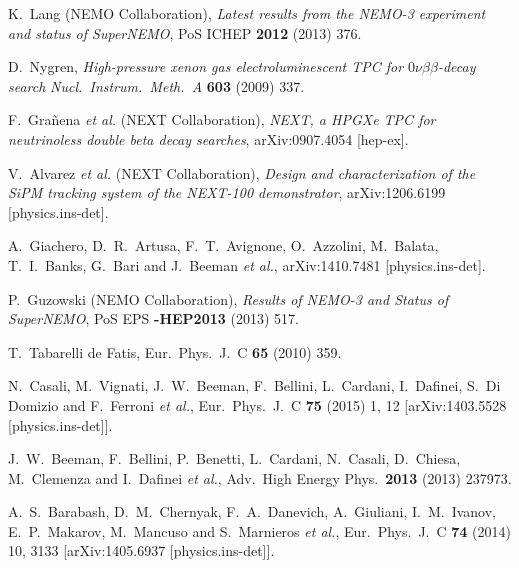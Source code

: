 \documentclass{PoS}
\begin{document}
\begin{thebibliography}{99}
   K.~Lang (NEMO Collaboration),
   \emph{Latest results from the NEMO-3 experiment and status of SuperNEMO},
   PoS ICHEP {\bf 2012} (2013) 376.

   D.~Nygren,
   \emph{High-pressure xenon gas electroluminescent TPC for $0\nu\beta\beta$-decay search}
   \emph{Nucl.\ Instrum.\ Meth.\ A} {\bf 603} (2009) 337.

   F.~Gra\~nena {\it et al.} (NEXT Collaboration),
   \emph{NEXT, a HPGXe TPC for neutrinoless double beta decay searches},
   arXiv:0907.4054 [hep-ex].

  V.~Alvarez {\it et al.} (NEXT Collaboration),
   \emph{Design and characterization of the SiPM tracking system of the NEXT-100 demonstrator},
   arXiv:1206.6199 [physics.ins-det].

  A.~Giachero, D.~R.~Artusa, F.~T.~Avignone, O.~Azzolini, M.~Balata, T.~I.~Banks, G.~Bari and J.~Beeman {\it et al.},
  arXiv:1410.7481 [physics.ins-det].

   P.~Guzowski (NEMO Collaboration),
   \emph{Results of NEMO-3 and Status of SuperNEMO},
   PoS EPS {\bf -HEP2013} (2013) 517.

  T.~Tabarelli de Fatis,
  Eur.\ Phys.\ J.\ C {\bf 65} (2010) 359.

  N.~Casali, M.~Vignati, J.~W.~Beeman, F.~Bellini, L.~Cardani, I.~Dafinei, S.~Di Domizio and F.~Ferroni {\it et al.},
  Eur.\ Phys.\ J.\ C {\bf 75} (2015) 1,  12
  [arXiv:1403.5528 [physics.ins-det]].

  J.~W.~Beeman, F.~Bellini, P.~Benetti, L.~Cardani, N.~Casali, D.~Chiesa, M.~Clemenza and I.~Dafinei {\it et al.},
  Adv.\ High Energy Phys.\  {\bf 2013} (2013) 237973.

  A.~S.~Barabash, D.~M.~Chernyak, F.~A.~Danevich, A.~Giuliani, I.~M.~Ivanov, E.~P.~Makarov, M.~Mancuso and S.~Marnieros {\it et al.},
  Eur.\ Phys.\ J.\ C {\bf 74} (2014) 10,  3133
  [arXiv:1405.6937 [physics.ins-det]].


\end{thebibliography}
\end{document}

